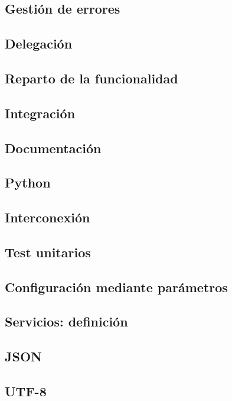 \subsection{Gestión de errores}

\subsection{Delegación}

\subsection{Reparto de la funcionalidad}

\subsection{Integración}

\subsection{Documentación}

\subsection{Python}

\subsection{Interconexión}

\subsection{Test unitarios}

\subsection{Configuración mediante parámetros}

\subsection{Servicios: definición}

\subsection{JSON}

\subsection{UTF-8}

